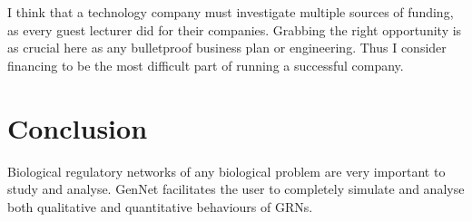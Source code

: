 \documentclass[twocolumn]{bmcart}%
\begin{document}
\par I think that a technology company must investigate multiple sources of funding, as every guest lecturer did for their companies. Grabbing the right opportunity is as crucial here as any bulletproof business plan or engineering. Thus I consider financing to be the most difficult part of running a successful company.
      
\section*{Conclusion}
Biological regulatory networks of any biological problem are very important to study and analyse. GenNet facilitates the user to completely simulate and analyse both qualitative and quantitative behaviours of GRNs.


\begin{backmatter}

\nocite{*}

\end{backmatter}
\end{document}
